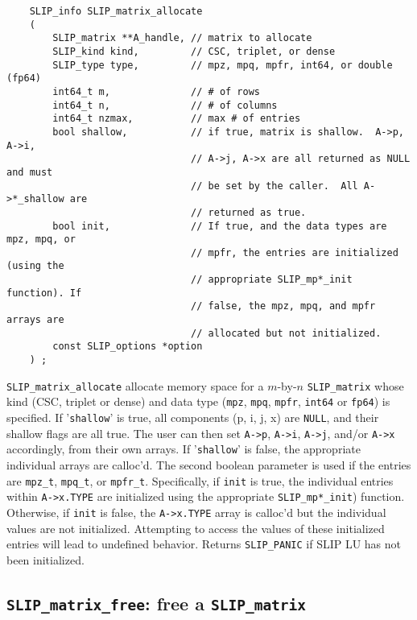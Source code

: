 \documentclass[12pt]{article}
\theoremstyle{definition}
\begin{document}
\begin{mdframed}[userdefinedwidth=6in]
{\footnotesize
\begin{verbatim}
    SLIP_info SLIP_matrix_allocate
    (
        SLIP_matrix **A_handle, // matrix to allocate
        SLIP_kind kind,         // CSC, triplet, or dense
        SLIP_type type,         // mpz, mpq, mpfr, int64, or double (fp64)
        int64_t m,              // # of rows
        int64_t n,              // # of columns
        int64_t nzmax,          // max # of entries
        bool shallow,           // if true, matrix is shallow.  A->p, A->i,
                                // A->j, A->x are all returned as NULL and must
                                // be set by the caller.  All A->*_shallow are
                                // returned as true.
        bool init,              // If true, and the data types are mpz, mpq, or
                                // mpfr, the entries are initialized (using the
                                // appropriate SLIP_mp*_init function). If
                                // false, the mpz, mpq, and mpfr arrays are
                                // allocated but not initialized.
        const SLIP_options *option
    ) ;
\end{verbatim}
} \end{mdframed}

\verb|SLIP_matrix_allocate| allocate memory space for a $m$-by-$n$
\verb|SLIP_matrix| whose kind (CSC, triplet or dense) and data type
(\verb|mpz|, \verb|mpq|, \verb|mpfr|, \verb|int64| or \verb|fp64|) is
specified. If '\verb|shallow|' is true, all components (p, i, j, x) are
\verb|NULL|, and their shallow flags are all true. The user can then set
\verb|A->p|, \verb|A->i|, \verb|A->j|, and/or \verb|A->x| accordingly, from
their own arrays. If '\verb|shallow|' is false, the appropriate individual
arrays are calloc'd. The second boolean parameter is used if the entries are
\verb|mpz_t|, \verb|mpq_t|, or \verb|mpfr_t|. Specifically, if \verb|init| is
true, the individual entries within \verb|A->x.TYPE| are initialized using the
appropriate \verb|SLIP_mp*_init|) function. Otherwise, if \verb|init| is false,
the \verb|A->x.TYPE| array is calloc'd but the individual values are not
initialized.  Attempting to access the values of these initialized entries will
lead to undefined behavior.  Returns \verb|SLIP_PANIC| if SLIP LU has not been
initialized.

\cprotect\subsection{\verb|SLIP_matrix_free|: free a \verb|SLIP_matrix|}
\label{s:user:matrix_free}
\end{document}
